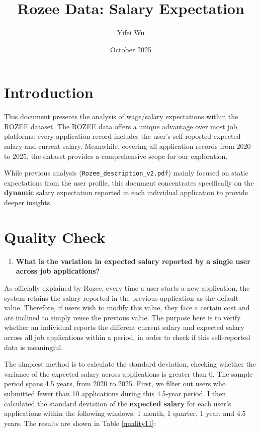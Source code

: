 \documentclass[12pt]{article}
\title{Rozee Data: Salary Expectation}
\author{Yifei Wu}
\date{October 2025}
\begin{document}
\onehalfspacing

\maketitle

\tableofcontents
\listoffigures
\listoftables

\newpage
\section{Introduction}

This document presents the analysis of wage/salary expectations within the ROZEE dataset. The ROZEE data offers a unique advantage over most job platforms: every application record includes the user's self-reported expected salary and current salary. Meanwhile, covering all application records from 2020 to 2025, the dataset provides a comprehensive scope for our exploration.

While previous analysis (\texttt{Rozee\_description\_v2.pdf}) mainly focused on static expectations from the user profile, this document concentrates specifically on the \textbf{dynamic} salary expectation reported in each individual application to provide deeper insights.


\section{Quality Check}

\begin{enumerate}
    \item \textbf{What is the variation in expected salary reported by a single user across job applications?}
\end{enumerate}

As officially explained by Rozee, every time a user starts a new application, the system retains the salary reported in the previous application as the default value. Therefore, if users wish to modify this value, they face a certain cost and are inclined to simply reuse the previous value. The purpose here is to verify whether an individual reports the different current salary and expected salary across all job applications within a period, in order to check if this self-reported data is meaningful.

The simplest method is to calculate the standard deviation, checking whether the variance of the expected salary across applications is greater than 0. The sample period spans 4.5 years, from 2020 to 2025. First, we filter out users who submitted fewer than 10 applications during this 4.5-year period. I then calculated the standard deviation of the \textbf{expected salary} for each user's applications within the following windows: 1 month, 1 quarter, 1 year, and 4.5 years. The results are shown in Table \ref{quality11}:
\end{document}
